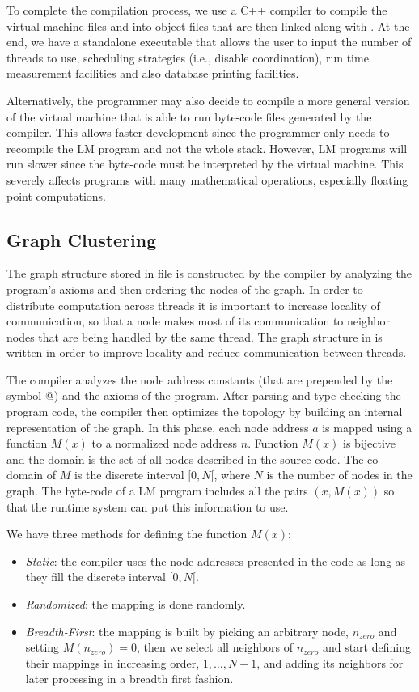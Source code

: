 To complete the compilation process, we use a C++ compiler to compile the
virtual machine files and  into object files that are then
linked along with . At the end, we have a standalone
executable that allows the user to input the number of threads to use,
scheduling strategies (i.e., disable coordination), run time measurement
facilities and also database printing facilities.

Alternatively, the programmer may also decide to compile a more general version
of the virtual machine that is able to run byte-code files generated by the
compiler. This allows faster development since the programmer only needs to
recompile the LM program and not the whole stack. However, LM programs will run
slower since the byte-code must be interpreted by the virtual machine. This
severely affects programs with many mathematical operations, especially floating
point computations.

\iffalse
\subsection{Graph Clustering}

The graph structure stored in file  is constructed by the
compiler by analyzing the program's axioms and then ordering the nodes of the
graph.  In order to distribute computation across threads it is important to
increase locality of communication, so that a node makes most of its
communication to neighbor nodes that are being handled by the same thread. The
graph structure in  is written in order to improve locality
and reduce communication between threads.

The compiler analyzes the node address constants (that are prepended by the
symbol @) and the axioms of the program. After parsing and type-checking the
program code, the compiler then optimizes the topology by building an internal
representation of the graph.  In this phase, each node address $a$ is mapped
using a function $M(x)$ to a normalized node address $n$. Function $M(x)$ is
bijective and the domain is the set of all nodes described in the source code.
The co-domain of $M$ is the discrete interval $[0, N[$, where $N$ is the number
of nodes in the graph. The byte-code of a LM program includes all the pairs $(x,
M(x))$ so that the runtime system can put this information to use.

We have three methods for defining the function $M(x)$:

\begin{itemize}
   \item \emph{Static}: the compiler uses the node addresses presented in the
      code as long as they fill the discrete interval $[0, N[$.
   \item \emph{Randomized}: the mapping is done randomly.
   \item \emph{Breadth-First}: the mapping is built by picking an arbitrary node, $n_{zero}$
   and setting $M(n_{zero}) = 0$, then we select all neighbors of $n_{zero}$ and start defining
   their mappings in increasing order, $1, \dotsc, N-1$, and adding its neighbors for later processing
   in a breadth first fashion.
\end{itemize}

